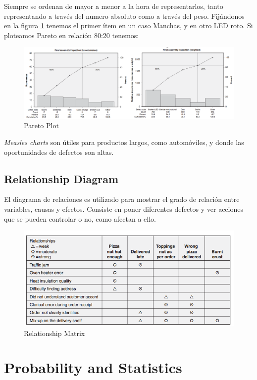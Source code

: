 \documentclass[]{article}
\begin{document}
Siempre se ordenan de mayor a menor a la hora de representarlos, tanto representando a través del numero absoluto como  a través del peso. Fijándonos en la figura \ref{fig:ParetoPlot} tenemos el primer ítem en un caso Manchas, y en otro LED roto. 
Si ploteamos Pareto en relación 80:20 tenemos:

\begin{figure}[ht!]
	\centering
	\includegraphics[width=180mm]{imagenes/ParetoPlot.png}
	\caption{Pareto Plot}
	\label{fig:ParetoPlot}
\end{figure}

\textit{Measles charts} son útiles para productos largos, como automóviles, y donde las oportunidades de defectos son altas.

\subsection{Relationship Diagram}

El diagrama de relaciones es utilizado para mostrar el grado de relación entre variables, causas y efectos. Consiste en poner diferentes defectos y ver acciones que se pueden controlar o no, como afectan a ello.

\begin{figure}[ht!]
	\centering
	\includegraphics[width=120mm]{imagenes/RelationshipMatrix.png}
	\caption{Relationship Matrix}
	\label{fig:RelationshipMatrix}
\end{figure}

\section{Probability and Statistics}
\end{document}
